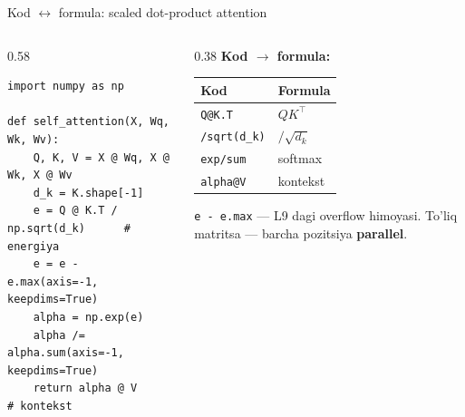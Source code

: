\documentclass[aspectratio=169,11pt]{beamer}
\begin{document}
\begin{frame}[fragile]{Kod $\leftrightarrow$ formula: scaled dot-product attention}
  \begin{columns}[T]
    \begin{column}{0.58\textwidth}
\begin{lstlisting}
import numpy as np

def self_attention(X, Wq, Wk, Wv):
    Q, K, V = X @ Wq, X @ Wk, X @ Wv
    d_k = K.shape[-1]
    e = Q @ K.T / np.sqrt(d_k)      # energiya
    e = e - e.max(axis=-1, keepdims=True)
    alpha = np.exp(e)
    alpha /= alpha.sum(axis=-1, keepdims=True)
    return alpha @ V                # kontekst
\end{lstlisting}
    \end{column}
    \begin{column}{0.38\textwidth}
      \textbf{Kod $\to$ formula:}\\[3pt]
      \footnotesize
      \begin{tabular}{p{1.9cm}p{1.9cm}}
        \toprule
        Kod & Formula \\
        \midrule
        \texttt{Q@K.T} & $QK^{\top}$ \\
        \texttt{/sqrt(d\_k)} & $/\sqrt{d_k}$ \\
        \texttt{exp/sum} & softmax \\
        \texttt{alpha@V} & kontekst \\
        \bottomrule
      \end{tabular}
      \vspace{4pt}
      \begin{tcolorbox}[okbox,top=2pt,bottom=2pt]
        \footnotesize
        \texttt{e - e.max} --- L9 dagi overflow himoyasi. To'liq matritsa ---
        barcha pozitsiya \textbf{parallel}.
      \end{tcolorbox}
    \end{column}
  \end{columns}
\end{frame}
\end{document}
